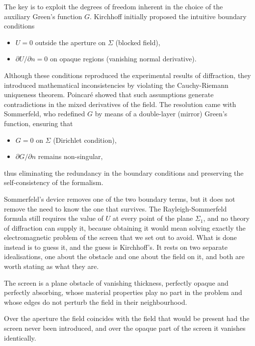 		The key is to exploit the degrees of freedom inherent in the choice of the auxiliary Green's function $G$. Kirchhoff initially proposed the intuitive boundary conditions
		\begin{itemize}
			\item $U = 0$ outside the aperture on $\Sigma$ (blocked field),
			\item $\partial U/\partial n = 0$ on opaque regions (vanishing normal derivative).
		\end{itemize}

		Although these conditions reproduced the experimental results of diffraction, they introduced mathematical inconsistencies by violating the Cauchy-Riemann uniqueness theorem. Poincaré showed that such assumptions generate contradictions in the mixed derivatives of the field. The resolution came with Sommerfeld, who redefined $G$ by means of a double-layer (mirror) Green's function, ensuring that
		\begin{itemize}
			\item $G = 0$ on $\Sigma$ (Dirichlet condition),
			\item $\partial G/\partial n$ remains non-singular,
		\end{itemize}

	thus eliminating the redundancy in the boundary conditions and preserving the self-consistency of the formalism.

	Sommerfeld's device removes one of the two boundary terms, but it does not remove the need to know the one that survives. The Rayleigh-Sommerfeld formula still requires the value of $U$ at every point of the plane $\Sigma_{1}$, and no theory of diffraction can supply it, because obtaining it would mean solving exactly the electromagnetic problem of the screen that we set out to avoid. What is done instead is to guess it, and the guess is Kirchhoff's. It rests on two separate idealisations, one about the obstacle and one about the field on it, and both are worth stating as what they are.

	\begin{Assumption}
		The screen is a plane obstacle of vanishing thickness, perfectly opaque and perfectly absorbing, whose material properties play no part in the problem and whose edges do not perturb the field in their neighbourhood.
	\end{Assumption}

	\begin{Assumption}
		Over the aperture the field coincides with the field that would be present had the screen never been introduced, and over the opaque part of the screen it vanishes identically.
	\end{Assumption}

